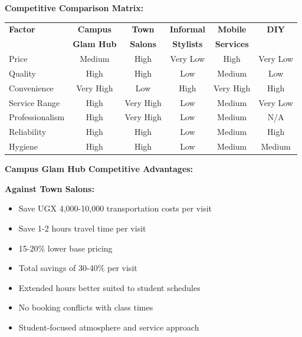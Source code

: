 \vspace{1em}

\textbf{Competitive Comparison Matrix:}

\begin{center}
\begin{tabular}{|l|c|c|c|c|c|}
\hline
\textbf{Factor} & \textbf{Campus} & \textbf{Town} & \textbf{Informal} & \textbf{Mobile} & \textbf{DIY} \\
 & \textbf{Glam Hub} & \textbf{Salons} & \textbf{Stylists} & \textbf{Services} & \\
\hline
Price & Medium & High & Very Low & High & Very Low \\
\hline
Quality & High & High & Low & Medium & Low \\
\hline
Convenience & Very High & Low & High & Very High & High \\
\hline
Service Range & High & Very High & Low & Medium & Very Low \\
\hline
Professionalism & High & Very High & Low & Medium & N/A \\
\hline
Reliability & High & High & Low & Medium & High \\
\hline
Hygiene & High & High & Low & Medium & Medium \\
\hline
\end{tabular}
\end{center}

\vspace{1em}

\textbf{Campus Glam Hub Competitive Advantages:}

\textbf{Against Town Salons:}
\begin{itemize}[leftmargin=2em]
    \item Save UGX 4,000-10,000 transportation costs per visit
    \item Save 1-2 hours travel time per visit
    \item 15-20\% lower base pricing
    \item Total savings of 30-40\% per visit
    \item Extended hours better suited to student schedules
    \item No booking conflicts with class times
    \item Student-focused atmosphere and service approach
\end{itemize}

